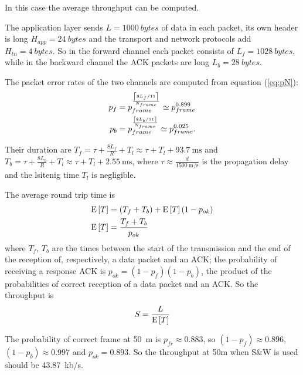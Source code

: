 In this case the average throughput can be computed.

The application layer sends $L=\SI{1000}{bytes}$ of data in each
packet, its own header is long $H_{app} = \SI{24}{bytes}$ and the
transport and network protocols add $H_{tn} = \SI{4}{bytes}$. So in
the forward channel each packet consists of $L_f = \SI{1028}{bytes}$,
while in the backward channel the ACK packets are long $L_b
= \SI{28}{bytes}$.

The packet error rates of the two channels are computed
from equation (\ref{eq:pN}):
\begin{align}
  p_f &= p_{frame}^\frac{\left\lceil8 L_f / 11\right\rceil}{N_{frame}} \simeq p_{frame}^{0.899} \\
  p_b &= p_{frame}^\frac{\left\lceil8 L_b / 11\right\rceil}{N_{frame}} \simeq p_{frame}^{0.025} .
\end{align}

Their duration are $T_f = \tau + \frac{8L_f}{R} + T_l \approx \tau +
T_l + \SI{93.7}{\ms}$ and $T_b = \tau + \frac{8L_b}{R} +T_l \approx
\tau + T_l + \SI{2.55}{\ms}$, where $\tau \approx
\frac{d}{\SI{1500}{\m\per\s}}$ is the propagation delay and the
lsitenig time $T_l$ is negligible.

The average round trip time is
\begin{align}
  \operatorname{E}\left[T\right] &= (T_f + T_b) + \operatorname{E}\left[T\right](1-p_{ok}) \\
  \operatorname{E}\left[T\right] &= \frac{T_f + T_b}{p_{ok}}
\end{align}
where $T_f$, $T_b$ are the times between the start of the transmission
and the end of the reception of, respectively, a data packet and an
ACK; the probability of receiving a response ACK is $p_{ok} =
(1-p_f)(1-p_b)$, the product of the probabilities of correct reception
of a data packet and an ACK.
%
So the throughput is
\begin{equation}
  S = \frac{L}{\operatorname{E}\left[T\right]}
\end{equation}

The probability of correct frame at \SI{50}{\m} is $p_{fr} \approx
0.883$, so $(1-p_f) \approx 0.896$, $(1-p_b) \approx 0.997$ and
$p_{ok} = 0.893$. So the throughput at 50m when S\&W is used should be
\SI{43.87}{kb/s}.

